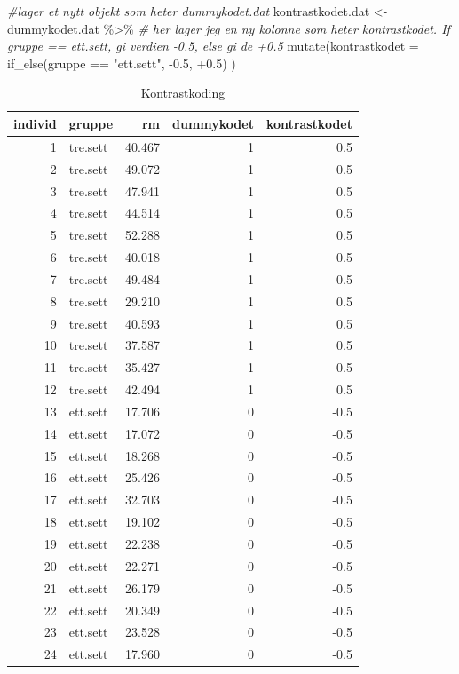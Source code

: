 \documentclass[
]{book}
\newenvironment{Shaded}{\begin{snugshade}}{\end{snugshade}}
\newcommand{\AttributeTok}[1]{\textcolor[rgb]{0.77,0.63,0.00}{#1}}
\newcommand{\CommentTok}[1]{\textcolor[rgb]{0.56,0.35,0.01}{\textit{#1}}}
\newcommand{\FloatTok}[1]{\textcolor[rgb]{0.00,0.00,0.81}{#1}}
\newcommand{\FunctionTok}[1]{\textcolor[rgb]{0.00,0.00,0.00}{#1}}
\newcommand{\NormalTok}[1]{#1}
\newcommand{\OtherTok}[1]{\textcolor[rgb]{0.56,0.35,0.01}{#1}}
\newcommand{\SpecialCharTok}[1]{\textcolor[rgb]{0.00,0.00,0.00}{#1}}
\newcommand{\StringTok}[1]{\textcolor[rgb]{0.31,0.60,0.02}{#1}}
\begin{document}
\begin{Shaded}
\begin{Highlighting}[]
\CommentTok{\#lager et nytt objekt som heter dummykodet.dat}
\NormalTok{kontrastkodet.dat }\OtherTok{\textless{}{-}}\NormalTok{ dummykodet.dat }\SpecialCharTok{\%\textgreater{}\%}
  \CommentTok{\# her lager jeg en ny kolonne som heter kontrastkodet. If gruppe == \textquotesingle{}ett.sett\textquotesingle{}, gi verdien {-}0.5, else gi de +0.5}
  \FunctionTok{mutate}\NormalTok{(}\AttributeTok{kontrastkodet =} \FunctionTok{if\_else}\NormalTok{(gruppe }\SpecialCharTok{==} \StringTok{"ett.sett"}\NormalTok{, }\SpecialCharTok{{-}}\FloatTok{0.5}\NormalTok{, }\SpecialCharTok{+}\FloatTok{0.5}\NormalTok{)}
\NormalTok{         )}
\end{Highlighting}
\end{Shaded}

\begin{table}

\caption{\label{tab:unnamed-chunk-6}Kontrastkoding}
\centering
\begin{tabular}[t]{r|l|r|r|r}
\hline
individ & gruppe & rm & dummykodet & kontrastkodet\\
\hline
1 & tre.sett & 40.467 & 1 & 0.5\\
\hline
2 & tre.sett & 49.072 & 1 & 0.5\\
\hline
3 & tre.sett & 47.941 & 1 & 0.5\\
\hline
4 & tre.sett & 44.514 & 1 & 0.5\\
\hline
5 & tre.sett & 52.288 & 1 & 0.5\\
\hline
6 & tre.sett & 40.018 & 1 & 0.5\\
\hline
7 & tre.sett & 49.484 & 1 & 0.5\\
\hline
8 & tre.sett & 29.210 & 1 & 0.5\\
\hline
9 & tre.sett & 40.593 & 1 & 0.5\\
\hline
10 & tre.sett & 37.587 & 1 & 0.5\\
\hline
11 & tre.sett & 35.427 & 1 & 0.5\\
\hline
12 & tre.sett & 42.494 & 1 & 0.5\\
\hline
13 & ett.sett & 17.706 & 0 & -0.5\\
\hline
14 & ett.sett & 17.072 & 0 & -0.5\\
\hline
15 & ett.sett & 18.268 & 0 & -0.5\\
\hline
16 & ett.sett & 25.426 & 0 & -0.5\\
\hline
17 & ett.sett & 32.703 & 0 & -0.5\\
\hline
18 & ett.sett & 19.102 & 0 & -0.5\\
\hline
19 & ett.sett & 22.238 & 0 & -0.5\\
\hline
20 & ett.sett & 22.271 & 0 & -0.5\\
\hline
21 & ett.sett & 26.179 & 0 & -0.5\\
\hline
22 & ett.sett & 20.349 & 0 & -0.5\\
\hline
23 & ett.sett & 23.528 & 0 & -0.5\\
\hline
24 & ett.sett & 17.960 & 0 & -0.5\\
\hline
\end{tabular}
\end{table}
\end{document}
